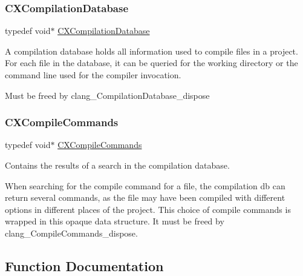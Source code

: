 \subsubsection{\texorpdfstring{C\+X\+Compilation\+Database}{CXCompilationDatabase}}
{\footnotesize\ttfamily typedef void$\ast$ \mbox{\hyperlink{group__COMPILATIONDB_gaecfc6e98d321bc436061472f4e4f84b2}{C\+X\+Compilation\+Database}}}

A compilation database holds all information used to compile files in a project. For each file in the database, it can be queried for the working directory or the command line used for the compiler invocation.

Must be freed by {\ttfamily clang\+\_\+\+Compilation\+Database\+\_\+dispose} \mbox{\label{group__COMPILATIONDB_gab8bb09eb53b86dbd645dc3ed2b6b7248}} 
\subsubsection{\texorpdfstring{C\+X\+Compile\+Commands}{CXCompileCommands}}
{\footnotesize\ttfamily typedef void$\ast$ \mbox{\hyperlink{group__COMPILATIONDB_gab8bb09eb53b86dbd645dc3ed2b6b7248}{C\+X\+Compile\+Commands}}}



Contains the results of a search in the compilation database. 

When searching for the compile command for a file, the compilation db can return several commands, as the file may have been compiled with different options in different places of the project. This choice of compile commands is wrapped in this opaque data structure. It must be freed by {\ttfamily clang\+\_\+\+Compile\+Commands\+\_\+dispose}. 

\subsection{Function Documentation}
\mbox{\label{group__COMPILATIONDB_gae0822a6a54afaea92bad5d3b3256bf26}} 

